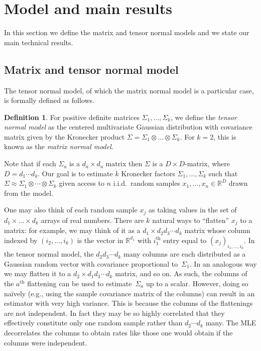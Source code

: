 \documentclass[aos]{imsart}
\theoremstyle{definition}
\newtheorem{definition}[theorem]{Definition}
\numberwithin{equation}{section}
\newcommand{\R}{{\mathbb{R}}}
\newcommand{\ot}{\otimes}
\begin{document}
\section{Model and main results}\label{sec:main results}
In this section we define the matrix and tensor normal models and we state our main technical results.

\subsection{Matrix and tensor normal model}\label{subsec:model}
The tensor normal model, of which the matrix normal model is a particular case, is formally defined as follows.

\begin{definition}
For positive definite matrices $\Sigma_1,\dots,\Sigma_k$, we define the \emph{tensor normal model} as the centered multivariate Gaussian distribution with covariance matrix given by the Kronecker product $\Sigma = \Sigma_1 \ot \dots \ot \Sigma_k$.
For $k=2$, this is known as the \emph{matrix normal model}.
\end{definition}

\noindent
Note that if each $\Sigma_a$ is a $d_a\times d_a$ matrix then $\Sigma$ is a $D\times D$-matrix, where $D=d_1 \cdots d_k$.
Our goal is to estimate $k$ Kronecker factors $\Sigma_1, \dots, \Sigma_k$ such that $\Sigma \approx \Sigma_1 \ot \cdots \ot \Sigma_k$ given access to $n$ i.i.d.\ random samples $x_1, \dots, x_n \in \R^D$ drawn from the model.

One may also think of each random sample $x_j$ as taking values in the set of $d_1 \times \dots \times d_k$ arrays of real numbers.
There are $k$ natural ways to ``flatten'' $x_j$ to a matrix:
for example, we may think of it as a $d_1 \times d_2d_3\cdots{}d_k$ matrix whose column indexed by $(i_2,\dots, i_k)$ is the vector in $\R^{d_1}$ with $i_1^{\text{th}}$ entry equal to $(x_j)_{i_1, \dots, i_k}$.
In the tensor normal model, the $d_2d_3\cdots{}d_k$ many columns are each distributed as a Gaussian random vector with covariance proportional to~$\Sigma_1$.
In an analogous way we may flatten it to a $d_2 \times d_1d_3\cdots{}d_k$ matrix, and so on.
As such, the columns of the $a^{\text{th}}$ flattening can be used to estimate~$\Sigma_a$ up to a scalar.
However, doing so na\"ively (e.g., using the sample covariance matrix of the columns) can result in an estimator with very high variance.
This is because the columns of the flattenings are not independent.
In fact they may be so highly correlated that they effectively constitute only one random sample rather than $d_2\cdots{}d_k$ many.
The MLE decorrelates the columns to obtain rates like those one would obtain if the columns were independent.
\end{document}
